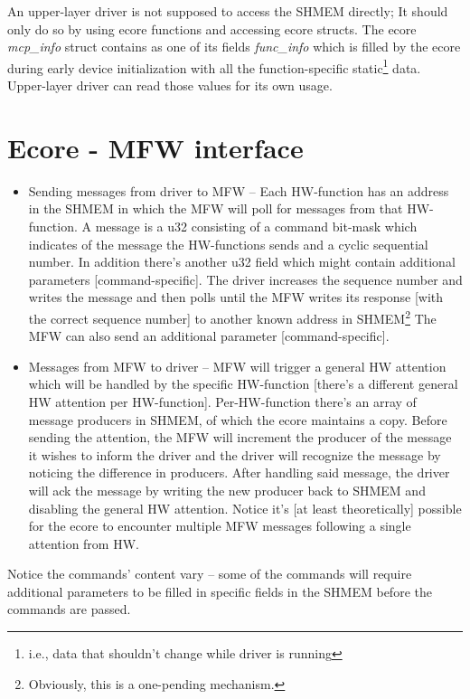 \documentclass[11pt,fleqn,hidelinks,oneside]{book} %
\begin{document}
An upper-layer driver is not supposed to access the SHMEM directly; It should only do so by using ecore functions and accessing ecore structs. The ecore \textit{mcp\_info} struct contains as one of its fields \textit{func\_info} which is filled by the ecore during early device initialization with all the function-specific static\footnote{i.e., data that shouldn't change while driver is running} data. Upper-layer driver can read those values for its own usage.

\section{Ecore - MFW interface}
\begin{itemize}
	\item Sending messages from driver to MFW -- Each HW-function has an address in the SHMEM in which the MFW will poll for messages from that HW-function.
	A message is a u32 consisting of a command bit-mask which indicates of the message the HW-functions sends and a cyclic sequential number.
	In addition there’s another u32 field which might contain additional parameters [command-specific].
	The driver increases the sequence number and writes the message and then polls until the MFW writes its response [with the correct sequence number] to another known address in SHMEM\footnote{Obviously, this is a one-pending mechanism.}
	The MFW can also send an additional parameter [command-specific]. \\
	
	\item Messages from MFW to driver -- MFW will trigger a general HW attention which will be handled by the specific HW-function [there’s a different general HW attention per HW-function].
	Per-HW-function there’s an array of message producers in SHMEM,  of which the ecore maintains a copy.
	Before sending the attention, the MFW will increment the producer of the message it wishes to inform the driver and the driver will recognize the message by noticing the difference in producers.
	After handling said message, the driver will ack the message by writing the new producer back to SHMEM and disabling the general HW attention.
	Notice it's [at least theoretically] possible for the ecore to encounter multiple MFW messages following a single attention from HW. \\
\end{itemize}

Notice the commands’ content vary -- some of the commands will require additional parameters to be filled in specific fields in the SHMEM before the commands are passed.
\end{document}
